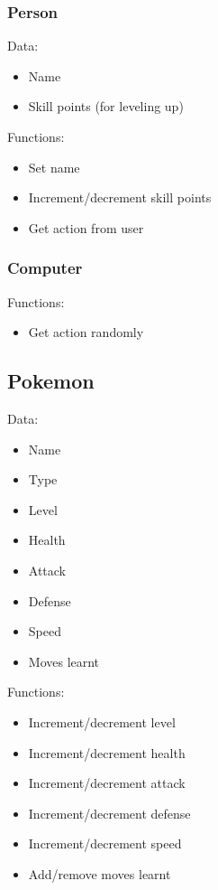 \documentclass{article}
\begin{document}
  \subsubsection{Person}
  Data:
  \begin{itemize}
    \item Name
    \item Skill points (for leveling up)
  \end{itemize}
  Functions:
  \begin{itemize}
    \item Set name
    \item Increment/decrement skill points
    \item Get action from user
  \end{itemize}
  
  \subsubsection{Computer}
  Functions:
  \begin{itemize}
    \item Get action randomly
  \end{itemize}
    
  \subsection{Pokemon}
  Data:
  \begin{itemize}
    \item Name
    \item Type
    \item Level
    \item Health
    \item Attack
    \item Defense
    \item Speed
    \item Moves learnt
  \end{itemize}
  Functions:
  \begin{itemize}
    \item Increment/decrement level
    \item Increment/decrement health
    \item Increment/decrement attack
    \item Increment/decrement defense
    \item Increment/decrement speed
    \item Add/remove moves learnt
  \end{itemize}
  
\end{document}
